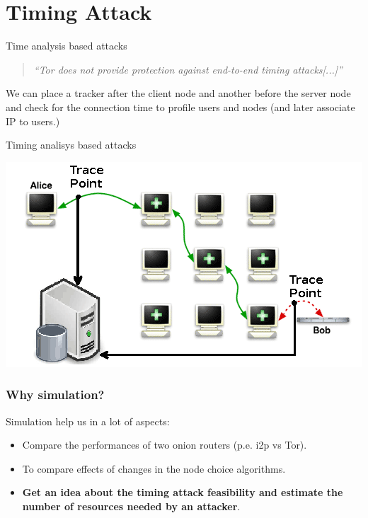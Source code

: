 
\section{Timing Attack}
\begin{frame}{Time analysis based attacks}{}
	\begin{quote}
		\emph{``Tor does not provide protection against end-to-end timing attacks[...]''}
	\end{quote}
	We can place a tracker after the client node and another before the server node
	and check for the connection time to profile users and nodes (and later associate IP to users.)
\end{frame}

\begin{frame}{Timing analisys based attacks}
	\begin{center}
		\includegraphics[scale=0.54]{imgs/timing_attack.png}
	\end{center}
\end{frame}

\begin{frame}
	\frametitle{Why simulation?}
	Simulation help us in a lot of aspects:

	\begin{itemize}
		\item Compare the performances of two onion routers (p.e. i2p vs
		Tor).
		\item To compare effects of changes in the node choice
		algorithms.
		\item \textbf{Get an idea about the timing attack feasibility 
and estimate the number of resources needed by an attacker}.
	\end{itemize}
\end{frame}

